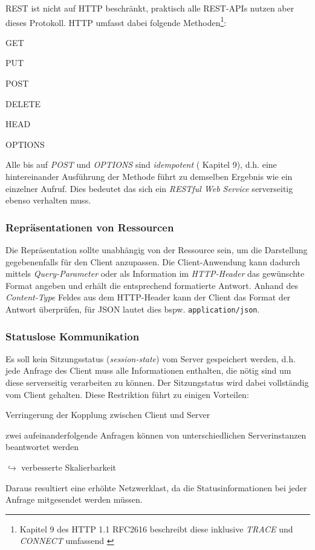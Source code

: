 \gls{REST} ist nicht auf HTTP beschränkt, praktisch alle REST-APIs nutzen aber dieses Protokoll. HTTP umfasst dabei folgende Methoden\footnote{Kapitel 9 des HTTP 1.1 RFC2616 beschreibt diese inklusive \emph{TRACE} und \emph{CONNECT} umfassend \cite{HTTP11RFC}}:
\begin{compactitem}
    \item GET
    \item PUT
    \item POST
    \item DELETE
    \item HEAD
    \item OPTIONS
\end{compactitem}

Alle bis auf \emph{POST} und \emph{OPTIONS} sind \emph{idempotent} (\cite{HTTP11RFC} Kapitel 9), d.h. eine hintereinander Ausführung der Methode führt zu demselben Ergebnis wie ein einzelner Aufruf. Dies bedeutet das sich ein \emph{RESTful Web Service} serverseitig ebenso verhalten muss.

\subsubsection{Repräsentationen von Ressourcen}
\label{sec:representationofresources}

Die Repräsentation sollte unabhängig von der Ressource sein, um die Darstellung gegebenenfalls für den Client anzupassen. 
Die Client-Anwendung kann dadurch mittels \emph{Query-Parameter} oder als Information im \emph{HTTP-Header} das gewünschte Format angeben und erhält die entsprechend formatierte Antwort.
Anhand des \emph{Content-Type} Feldes aus dem HTTP-Header kann der Client das Format der Antwort überprüfen, für \gls{JSON} lautet dies bspw. \texttt{application/json}.

\subsubsection{Statuslose Kommunikation}
\label{sec:stateless_communication}

Es soll kein Sitzungsstatus (\emph{session-state}) vom Server gespeichert werden, d.h. jede Anfrage des Client muss alle Informationen enthalten, die nötig sind um diese serverseitig verarbeiten zu können. Der Sitzungstatus wird dabei vollständig vom Client gehalten. 
Diese Restriktion führt zu einigen Vorteilen:
\begin{compactitem}
    \item Verringerung der Kopplung zwischen Client und Server
    \item zwei aufeinanderfolgende Anfragen können von unterschiedlichen Serverinstanzen beantwortet werden
    \item[$\hookrightarrow$] verbesserte Skalierbarkeit
\end{compactitem}

Daraus resultiert eine erhöhte Netzwerklast, da die Statusinformationen bei jeder Anfrage mitgesendet werden müssen.
